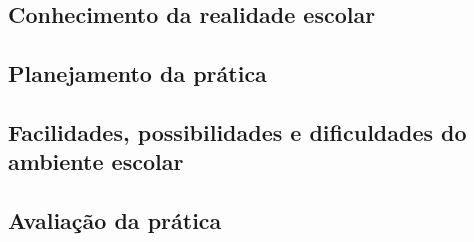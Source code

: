 \hspace{1.5cm}
\subsection{Conhecimento da realidade escolar}

\subsection{Planejamento da prática}

\subsection{Facilidades, possibilidades e dificuldades do ambiente escolar}

\subsection{Avaliação da prática}